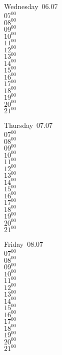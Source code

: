 \documentclass[11pt,a4paper]{book}\usepackage[]{graphicx}\usepackage[]{color}
\begin{document}
\begin{weekdaybox}
  Wednesday~06.07\\
  { 
  \vfill
  $07^{00}$\\
$08^{00}$\\
$09^{00}$\\
$10^{00}$\\
$11^{00}$\\
$12^{00}$\\
$13^{00}$\\
$14^{00}$\\
$15^{00}$\\
$16^{00}$\\
$17^{00}$\\
$18^{00}$\\
$19^{00}$\\
$20^{00}$\\
$21^{00}$\\
  }
\end{weekdaybox}
\clearpage
\begin{headerbox}
\end{headerbox}
\begin{weekdaybox}
  Thursday~07.07\\
  { 
  \vfill
  $07^{00}$\\
$08^{00}$\\
$09^{00}$\\
$10^{00}$\\
$11^{00}$\\
$12^{00}$\\
$13^{00}$\\
$14^{00}$\\
$15^{00}$\\
$16^{00}$\\
$17^{00}$\\
$18^{00}$\\
$19^{00}$\\
$20^{00}$\\
$21^{00}$\\
  }
\end{weekdaybox} 
\begin{weekdaybox}
  Friday~08.07\\
  { 
  \vfill
  $07^{00}$\\
$08^{00}$\\
$09^{00}$\\
$10^{00}$\\
$11^{00}$\\
$12^{00}$\\
$13^{00}$\\
$14^{00}$\\
$15^{00}$\\
$16^{00}$\\
$17^{00}$\\
$18^{00}$\\
$19^{00}$\\
$20^{00}$\\
$21^{00}$\\
  }
\end{weekdaybox}
\end{document}
